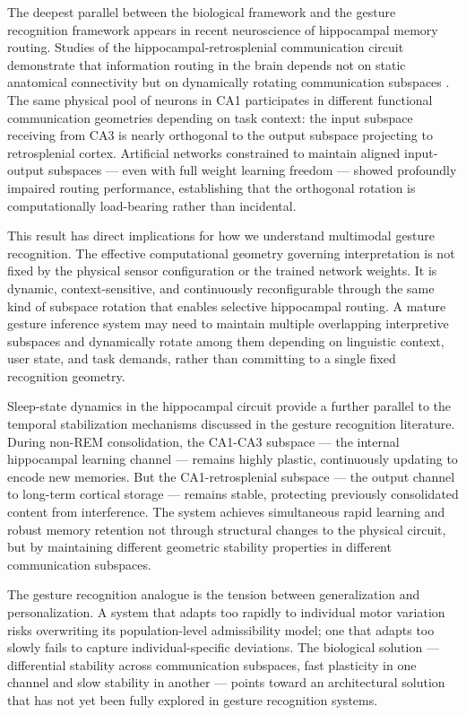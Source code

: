 \documentclass[11pt, a4paper]{article}
\theoremstyle{definition}
\begin{document}
The deepest parallel between the biological framework and the gesture recognition framework appears in recent neuroscience of hippocampal memory routing. Studies of the hippocampal-retrosplenial communication circuit demonstrate that information routing in the brain depends not on static anatomical connectivity but on dynamically rotating communication subspaces \cite{gonzalez2026}. The same physical pool of neurons in CA1 participates in different functional communication geometries depending on task context: the input subspace receiving from CA3 is nearly orthogonal to the output subspace projecting to retrosplenial cortex. Artificial networks constrained to maintain aligned input-output subspaces --- even with full weight learning freedom --- showed profoundly impaired routing performance, establishing that the orthogonal rotation is computationally load-bearing rather than incidental.

This result has direct implications for how we understand multimodal gesture recognition. The effective computational geometry governing interpretation is not fixed by the physical sensor configuration or the trained network weights. It is dynamic, context-sensitive, and continuously reconfigurable through the same kind of subspace rotation that enables selective hippocampal routing. A mature gesture inference system may need to maintain multiple overlapping interpretive subspaces and dynamically rotate among them depending on linguistic context, user state, and task demands, rather than committing to a single fixed recognition geometry.

Sleep-state dynamics in the hippocampal circuit provide a further parallel to the temporal stabilization mechanisms discussed in the gesture recognition literature. During non-REM consolidation, the CA1-CA3 subspace --- the internal hippocampal learning channel --- remains highly plastic, continuously updating to encode new memories. But the CA1-retrosplenial subspace --- the output channel to long-term cortical storage --- remains stable, protecting previously consolidated content from interference. The system achieves simultaneous rapid learning and robust memory retention not through structural changes to the physical circuit, but by maintaining different geometric stability properties in different communication subspaces.

The gesture recognition analogue is the tension between generalization and personalization. A system that adapts too rapidly to individual motor variation risks overwriting its population-level admissibility model; one that adapts too slowly fails to capture individual-specific deviations. The biological solution --- differential stability across communication subspaces, fast plasticity in one channel and slow stability in another --- points toward an architectural solution that has not yet been fully explored in gesture recognition systems.
\end{document}
